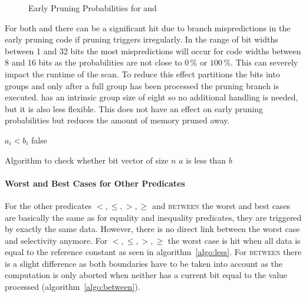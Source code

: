 \begin{figure}[h] \center
{}
\caption{Early Pruning Probabilities for \bwv{} and \bs{}}
\label{fig:earlypruningprobabilities}
\end{figure}

For both \bwv{} and \bs{} there can be a significant hit due to branch
mispredictions in the early pruning code if pruning triggers irregularly. In the
range of bit widths between 1 and 32 bits the most mispredictions will occur for
code widths between 8 and 16 bits as the probabilities are not close to $0\,\%$
or $100\,\%$. This can severely impact the runtime of the scan.  To
reduce this effect \bwv{} partitions the bits into groups and only after a full
group has been processed the pruning branch is executed. \bs{} has an intrinsic
group size of eight so no additional handling is needed, but it is also less
flexible. This does not have an effect on early pruning probabilities but
reduces the amount of memory pruned away.

\begin{algorithm}[h]
\begin{algorithmic}[1]
        \State \Return $a_i < b_i$
      \EndIf
    \EndFor
    \State \Return false
  \EndProcedure
\end{algorithmic}
\caption{Algorithm to check whether bit vector of size $n$ $a$ is less than $b$}
\label{algo:less}
\end{algorithm}

\paragraph{Worst and Best Cases for Other Predicates}

For the other predicates $<,\le,>,\ge$ and \textsc{between} the worst and best
cases are basically the same as for equality and inequality predicates, they are
triggered by exactly the same data.  However, there is no direct link between
the worst case and selectivity anymore. For $<,\le,>,\ge$ the worst case is hit
when all data is equal to the reference constant as seen in
algorithm~\ref{algo:less}. For \textsc{between} there is a slight difference as
both boundaries have to be taken into account as the computation is only aborted
when neither has a current bit equal to the value processed
(algorithm~\ref{algo:between}).

